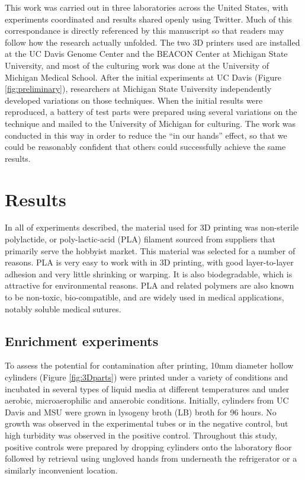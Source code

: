 \documentclass[fleqn,10pt]{wlpeerj}
\begin{document}
This work was carried out in three laboratories across the United States, with experiments coordinated and results shared openly using Twitter. Much of this correspondance is directly referenced by this manuscript so that readers may follow how the research actually unfolded. The two 3D printers used are installed at the UC Davis Genome Center and the BEACON Center at Michigan State University, and most of the culturing work was done at the University of Michigan Medical School. After the initial experiments at UC Davis (Figure \ref{fig:preliminary}), researchers at Michigan State University independently developed variations on those techniques. When the initial results were reproduced, a battery of test parts were prepared using several variations on the technique and mailed to the University of Michigan for culturing. The work was conducted in this way in order to reduce the ``in our hands'' effect, so that we could be reasonably confident that others could successfully achieve the same results. 


\section{Results}

In all of experiments described, the material used for 3D printing was non-sterile polylactide, or poly-lactic-acid (PLA) filament sourced from suppliers that primarily serve the hobbyist market. This material was selected for a number of reasons. PLA is very easy to work with in 3D printing, with good layer-to-layer adhesion and very little shrinking or warping. It is also biodegradable, which is attractive for environmental reasons. PLA and related polymers are also known to be non-toxic, bio-compatible, and are widely used in medical applications, notably soluble medical sutures. 

\subsection{Enrichment experiments}

To assess the potential for contamination after printing, 10mm diameter hollow cylinders (Figure \ref{fig:3Dparts}) were printed under a variety of conditions and incubated in several types of liquid media at different temperatures and under aerobic, microaerophilic and anaerobic conditions. Initially, cylinders from UC Davis and MSU were grown in lysogeny broth (LB) broth for 96 hours. No growth was observed in the experimental tubes or in the negative control, but high turbidity was observed in the positive control. Throughout this study, positive controls were prepared by dropping cylinders onto the laboratory floor followed by retrieval using ungloved hands from underneath the refrigerator or a similarly inconvenient location.
\end{document}
